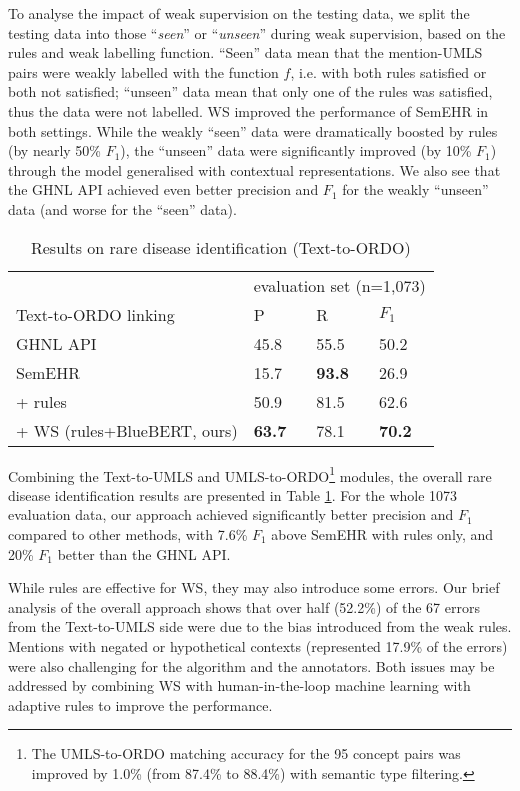 \documentclass[letterpaper, 10 pt, conference]{ieeeconf}
\begin{document}
To analyse the impact of weak supervision on the testing data, we split the testing data into those ``\emph{seen}'' or ``\emph{unseen}'' during weak supervision, based on the rules and weak labelling function. ``Seen'' data mean that the mention-UMLS pairs were weakly labelled with the function $f$, i.e. with both rules satisfied or both not satisfied; ``unseen'' data mean that only one of the rules was satisfied, thus the data were not labelled. WS improved the performance of SemEHR in both settings. While the weakly ``seen'' data were dramatically boosted by rules (by nearly 50\% $F_1$), the ``unseen'' data were significantly improved (by 10\% $F_1$) through the model generalised with contextual representations. We also see that the GHNL API achieved even better precision and $F_1$ for the weakly ``unseen'' data (and worse for the ``seen'' data).

\begin{table}[ht]
\caption{Results on rare disease identification (Text-to-ORDO)}
\center
\label{overall_rd_id_results}
\begin{tabular}{llll}
\cline{1-4}
                 & \multicolumn{3}{l}{evaluation set (n=1,073)} \\
Text-to-ORDO linking               & P           & R           & $F_1$        \\
\cline{1-4}
GHNL API \cite{Bodnari2020}         & 45.8        & 55.5        & 50.2        \\
\cline{1-4}
SemEHR \cite{Wu2018semehr}           & 15.7        & \textbf{93.8}        & 26.9        \\
+ rules          & 50.9        & 81.5        & 62.6        \\
+ WS (rules+BlueBERT, ours) & \textbf{63.7}        & 78.1        & \textbf{70.2}        \\
\cline{1-4}
\end{tabular}
\end{table}

Combining the Text-to-UMLS and UMLS-to-ORDO\footnote{The UMLS-to-ORDO matching accuracy for the 95 concept pairs was improved by 1.0\% (from 87.4\% to 88.4\%) with semantic type filtering.} modules, the overall rare disease identification results are presented in Table \ref{overall_rd_id_results}. For the whole 1073 evaluation data, our approach achieved significantly better precision and $F_1$ compared to other methods, with 7.6\% $F_1$ above SemEHR with rules only, and 20\% $F_1$ better than the GHNL API.

While rules are effective for WS, they may also introduce some errors. Our brief analysis of the overall approach shows that over half (52.2\%) of the 67 errors from the Text-to-UMLS side were due to the bias introduced from the weak rules. Mentions with negated or hypothetical contexts (represented 17.9\% of the errors) were also challenging for the algorithm and the annotators. Both issues may be addressed by combining WS with human-in-the-loop machine learning \cite{monarch2021} with adaptive rules to improve the performance.
\end{document}
